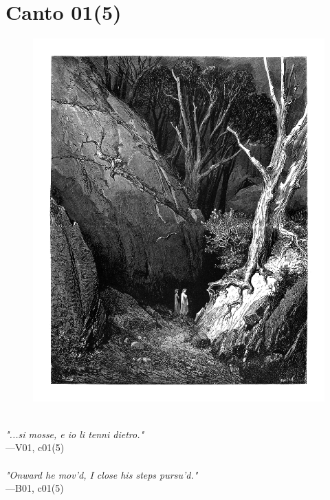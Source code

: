 \documentclass[../Dore_vision.tex]{subfiles}
\begin{document}
\newpage

\section{Canto 01(5)}

\begin{figure}[ht]
\centering
\includegraphics[height=\figsize]{illustrations/book_1/V01, c01(5).jpg}
\end{figure}

\begin{center}
\begin{minipage}{0.8\linewidth}
\textit{\\
"...si mosse, e io li tenni dietro."} \\
—V01, c01(5) \\~\\
\textit{"Onward he mov'd, I close his steps pursu'd."} \\
—B01, c01(5)
\end{minipage}
\end{center}
\end{document}
